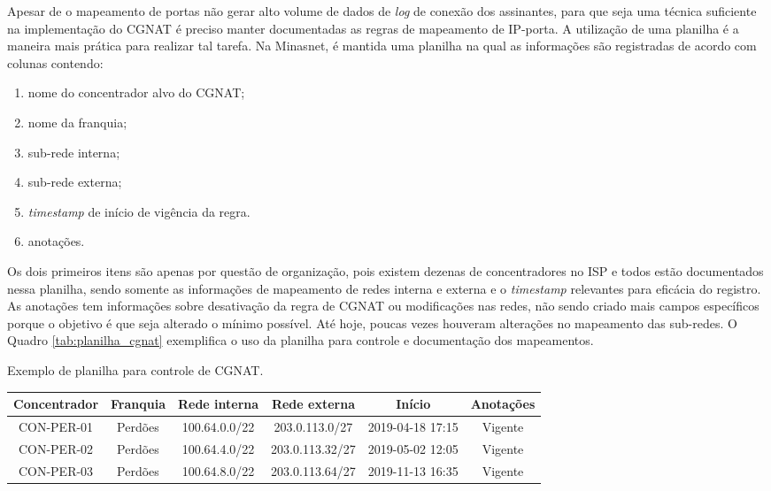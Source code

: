    Apesar de o mapeamento de portas não gerar alto volume de dados de \textit{log} de conexão dos assinantes, para que seja uma técnica suficiente na implementação do CGNAT é preciso manter documentadas as regras de mapeamento de IP-porta. A utilização de uma planilha é a maneira mais prática para realizar tal tarefa. Na Minasnet, é mantida uma planilha na qual as informações são registradas de acordo com colunas contendo:

   \begin{enumerate}[label=\alph*)]
       \item nome do concentrador alvo do CGNAT;
       \item nome da franquia;
       \item sub-rede interna;
       \item sub-rede externa;
       \item \textit{timestamp} de início de vigência da regra.
       \item anotações.
   \end{enumerate}
   
   Os dois primeiros itens são apenas por questão de organização, pois existem dezenas de concentradores no ISP e todos estão documentados nessa planilha, sendo somente as informações de mapeamento de redes interna e externa e o \textit{timestamp} relevantes para eficácia do registro. As anotações tem informações sobre desativação da regra de CGNAT ou modificações nas redes, não sendo criado mais campos específicos porque o objetivo é que seja alterado o mínimo possível. Até hoje, poucas vezes houveram alterações no mapeamento das sub-redes. O Quadro \ref{tab:planilha_cgnat} exemplifica o uso da planilha para controle e documentação dos mapeamentos.

   \begin{quadro}[htb]
        \begin{center}
            \caption{Exemplo de planilha para controle de CGNAT.} 
            \label{tab:planilha_cgnat}
            \vspace{0.2cm}
        \footnotesize
            \begin{tabular}{|c|c|c|c|c|c|}
            \hline
            Concentrador & Franquia & Rede interna & Rede externa & Início & Anotações \\
            \hline
            \hline
            CON-PER-01 & Perdões & 100.64.0.0/22 & 203.0.113.0/27 & 2019-04-18 17:15 & Vigente \\
            CON-PER-02 & Perdões & 100.64.4.0/22 & 203.0.113.32/27 & 2019-05-02 12:05 & Vigente \\
            CON-PER-03 & Perdões & 100.64.8.0/22 & 203.0.113.64/27 & 2019-11-13 16:35 & Vigente \\
            \hline 
            \end{tabular}
        \end{center}
    \end{quadro}


